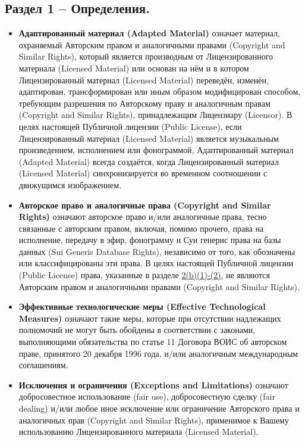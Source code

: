 \subsection*{Раздел 1 -- Определения.}
\begin{itemize}
\item[a.] \textbf{Адаптированный материал (Adapted Material)} означает материал, охраняемый Авторским правом и аналогичными правами (Copyright and Similar Rights), который является производным от Лицензированного материала (Licensed Material) или основан на нём и в котором Лицензированный материал (Licensed Material) переведён, изменён, адаптирован, трансформирован или иным образом модифицирован способом, требующим разрешения по Авторскому праву и аналогичным правам (Copyright and Similar Rights), принадлежащим Лицензиару (Licensor). В целях настоящей Публичной лицензии (Public License), если Лицензированный материал (Licensed Material) является музыкальным произведением, исполнением или фонограммой, Адаптированный материал (Adapted Material) всегда создаётся, когда Лицензированный материал (Licensed Material) синхронизируется во временном соотношении с движущимся изображением.

\item[b.] \textbf{Авторское право и аналогичные права (Copyright and Similar Rights)} означают авторское право и/или аналогичные права, тесно связанные с авторским правом, включая, помимо прочего, права на исполнение, передачу в эфир, фонограмму и Суи генерис права на базы данных (Sui Generis Database Rights), независимо от того, как обозначены или классифицированы эти права. В целях настоящей Публичной лицензии (Public License) права, указанные в разделе \href{https://creativecommons.org/licenses/by-nc-nd/4.0/legalcode#s2b}{2(b)(1)-(2)}, не являются Авторским правом и аналогичными правами (Copyright and Similar Rights).

\item[c.] \textbf{Эффективные технологические меры (Effective Technological Measures)} означают такие меры, которые при отсутствии надлежащих полномочий не могут быть обойдены в соответствии с законами, выполняющими обязательства по статье 11 Договора ВОИС об авторском праве, принятого 20 декабря 1996 года, и/или аналогичным международным соглашениям.

\item[d.] \textbf{Исключения и ограничения (Exceptions and Limitations)} означают добросовестное использование (fair use), добросовестную сделку (fair dealing) и/или любое иное исключение или ограничение Авторского права и аналогичных прав (Copyright and Similar Rights), применимое к Вашему использованию Лицензированного материала (Licensed Material).


\end{itemize}
